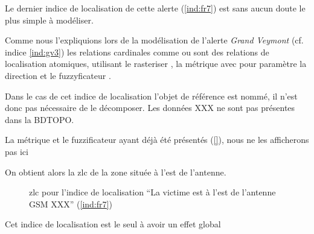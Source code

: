 
Le dernier indice de localisation de cette alerte (\ref{ind:fr7}) est
sans aucun doute le plus simple à modéliser.

Comme nous l'expliquions lors de la modélisation de l'alerte
\emph{Grand Veymont} (cf. indice \ref{ind:gv3}) les relations
cardinales comme  ou 
sont des relations de localisation atomiques, utilisant le rasteriser
, la métrique \onto[orla]{} avec pour paramètre
la direction et le fuzzyficateur .

Dans le cas de cet indice de localisation l'objet de référence est
nommé, il n'est donc pas nécessaire de le décomposer.
%
Les données XXX ne sont pas présentes dans la BDTOPO.

La métrique \onto[orla]{} et le fuzzificateur 
ayant déjà été présentés (\autoref{}), nous ne les afficherons pas ici

On obtient alors la \ac{zlc} de la zone située à l'est de l'antenne.

\begin{figure}
  \centering
  
  \caption{\ac{zlc} pour l'indice de localisation \enquote{La victime
      est à l'est de l'antenne GSM XXX} (\ref{ind:fr7})}
\end{figure}

Cet indice de localisation est le seul à avoir un effet global


